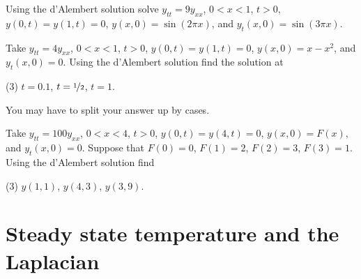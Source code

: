 \begin{exercise}
Using the d'Alembert solution solve $y_{tt} = 9y_{xx}$, $0 < x < 1$, $t >
0$,
$y(0,t) = y(1, t) = 0$, $y(x,0) = \sin (2 \pi x)$, and
$y_t(x,0) = \sin (3 \pi x)$.
\end{exercise}

\begin{exercise}
Take $y_{tt} = 4y_{xx}$, $0 < x < 1$, $t > 0$,
$y(0,t) = y(1, t) = 0$, $y(x,0) = x-x^2$, and
$y_t(x,0) = 0$.  Using the d'Alembert solution find
the solution at
\begin{tasks}(3)
\task $t=0.1$,
\task $t=\nicefrac{1}{2}$,
\task $t=1$.
\end{tasks}
You may have to split your answer up by cases.
\end{exercise}

\begin{exercise}
Take $y_{tt} = 100y_{xx}$, $0 < x < 4$, $t > 0$,
$y(0,t) = y(4, t) = 0$, $y(x,0) = F(x)$, and
$y_t(x,0) = 0$.  Suppose that
$F(0)=0$,
$F(1)=2$,
$F(2)=3$,
$F(3)=1$.
Using the d'Alembert solution find
\begin{tasks}(3)
\task $y(1,1)$,
\task $y(4,3)$,
\task $y(3,9)$.
\end{tasks}
\end{exercise}


\sectionnewpage
\section{Steady state temperature and the Laplacian}
\label{dirich:section}


